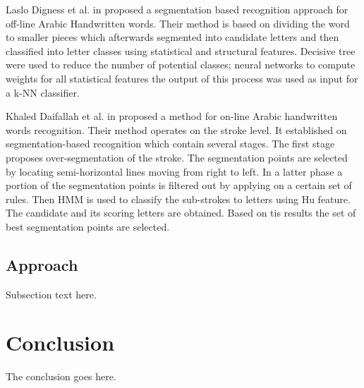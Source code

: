 \documentclass[12pt,journal,compsoc]{IEEEtran}
\begin{document}
Laslo Digness et al. in \cite{Dinges2011} proposed a segmentation based recognition approach for off-line Arabic Handwritten words. Their method is based on dividing the word to smaller pieces which afterwards segmented into candidate letters and then classified into letter classes using statistical and structural features. Decisive tree were used to reduce the number of potential classes; neural networks to compute weights for all statistical features the output of this process was used as input for a k-NN classifier.

Khaled Daifallah et al. in \cite{daifallah2009recognition} proposed a method for on-line Arabic handwritten words recognition. Their method operates on the stroke level. It established on segmentation-based recognition which contain several stages. The first stage proposes over-segmentation of the stroke. The segmentation points are selected by locating semi-horizontal lines moving from right to left. In a latter phase a portion of the segmentation points is filtered out by applying on a certain set of rules. Then HMM is used to classify the sub-strokes to letters using Hu feature. The candidate and its scoring letters are obtained. Based on tis results the set of best segmentation points are selected.   


\subsection{Approach}
Subsection text here.

\section{Conclusion}
The conclusion goes here.



\end{document}
